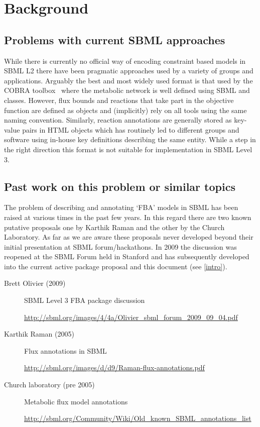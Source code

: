 
\section{Background}
\label{background}

\subsection{Problems with current SBML approaches}

While there is currently no official way of encoding constraint based models in SBML L2 there have been pragmatic approaches used by a variety of groups and applications. Arguably the best and most widely used format is that used by the \textsf{COBRA toolbox}~\citep{cobra} where the metabolic network is well defined using SBML \Reaction and \Species classes. However, flux bounds and reactions that take part in the objective function are defined as \LocalParameter objects and (implicitly) rely on all tools using the same naming convention. Similarly, reaction annotations are generally stored as key-value pairs in HTML \Notes objects which has routinely led to different groups and software using in-house key definitions describing the same entity. While a step in the right direction this format is not suitable for implementation in SBML Level 3.


\subsection{Past work on this problem or similar topics}
The problem of describing and annotating `FBA' models in SBML has been raised  at various times in the past few years. In this regard there are two known putative proposals one by Karthik Raman and the other by the Church Laboratory. As far as we are aware these proposals never developed beyond their initial presentation at SBML forum/hackathons. In 2009 the discussion was reopened at the SBML Forum held in Stanford and has subsequently developed into the current active package proposal and this document (see \ref{intro}).

\begin{description}
  \item[Brett Olivier (2009)] SBML Level 3 FBA package discussion
  \item[]\url{http://sbml.org/images/4/4a/Olivier_sbml_forum_2009_09_04.pdf}
  \item[Karthik Raman (2005)] Flux annotations in SBML
  \item[]\url{http://sbml.org/images/d/d9/Raman-flux-annotations.pdf}
  \item[Church laboratory (pre 2005)] Metabolic flux model annotations
  \item[]\url{http://sbml.org/Community/Wiki/Old_known_SBML_annotations_list}
\end{description}



